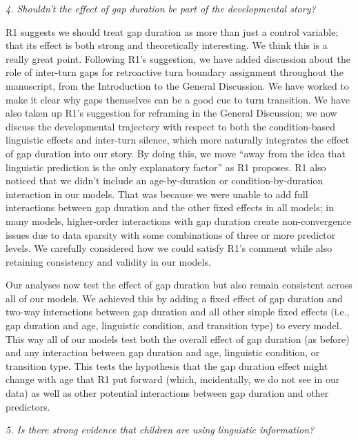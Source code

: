 \documentclass[11pt,a4paper]{letter} %
\begin{document}
\begin{letter}{}
\noindent \textit{4. Shouldn't the effect of gap duration be part of the developmental story?}

\noindent R1 suggests we should treat gap duration as more than just a control variable; that its effect is both strong and theoretically interesting. We think this is a really great point. Following R1's suggestion, we have added discussion about the role of inter-turn gaps for retroactive turn boundary assignment throughout the manuscript, from the Introduction to the General Discussion. We have worked to make it clear why gaps themselves can be a good cue to turn transition. We have also taken up R1's suggestion for reframing in the General Discussion; we now discuss the developmental trajectory with respect to both the condition-based linguistic effects and inter-turn silence, which more naturally integrates the effect of gap duration into our story. By doing this, we move ``away from the idea that linguistic prediction is the only explanatory factor'' as R1 proposes. R1 also noticed that we didn't include an age-by-duration or condition-by-duration interaction in our models. That was because we were unable to add full interactions between gap duration and the other fixed effects in all models; in many models, higher-order interactions with gap duration create non-convergence issues due to data sparsity with some combinations of three or more predictor levels. We carefully considered how we could satisfy R1's comment while also retaining consistency and validity in our models.

\noindent Our analyses now test the effect of gap duration but also remain consistent across all of our models. We achieved this by adding a fixed effect of gap duration and two-way interactions between gap duration and all other simple fixed effects (i.e., gap duration and age, linguistic condition, and transition type) to every model. This way all of our models test both the overall effect of gap duration (as before) and any interaction between gap duration and age, linguistic condition, or transition type. This tests the hypothesis that the gap duration effect might change with age that R1 put forward (which, incidentally, we do not see in our data) as well as other potential interactions between gap duration and other predictors.

\noindent \textit{5. Is there strong evidence that children are using linguistic information?}


\end{letter}
\end{document}
